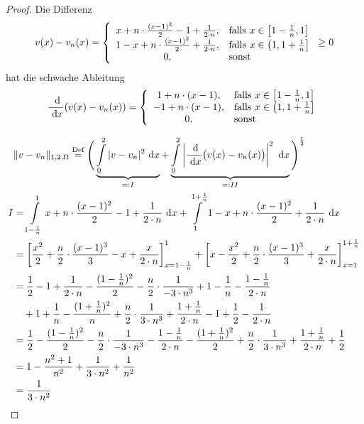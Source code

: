 \begin{proof}
	Die Differenz
	\begin{align*}
		v(x)-v_n(x)=\left\lbrace\begin{array}{cl}
			x+n\cdot\frac{(x-1)^2}{2}-1+\frac{1}{2\cdot n}, & \text{falls } x\in\left[1-\frac{1}{n},1\right]\\
			1-x+n\cdot\frac{(x-1)^2}{2}+\frac{1}{2\cdot n}, & \text{falls } x\in\left(1,1+\frac{1}{n}\right]\\
			0,&\text{sonst }
		\end{array}\right.\stackrel{\text{}}{\geq}0\\
	\end{align*}
	hat die schwache Ableitung
	\begin{align*}
		\frac{\text{ d}}{\text{ d} x}(v(x)-v_n(x))=\left\lbrace\begin{array}{cl}
			1+n\cdot(x-1), & \text{falls } x\in\left[1-\frac{1}{n},1\right]\\
			-1+n\cdot(x-1), & \text{falls } x\in\left(1,1+\frac{1}{n}\right]\\
			0,&\text{sonst }
		\end{array}\right.
	\end{align*}

	\begin{align*}
		&\Vert v-v_n\Vert_{1,2,\Omega}
		\overset{\text{Def}}=
		\Bigg(\underbrace{\int\limits_0^2|v -v_n|^2\text{ d} x}_{=:I}+\underbrace{\int\limits_0^2\left|\frac{\text{ d}}{\text{ d} x} \big(v(x)-v_n(x)\big)\right|^2\text{ d} x}_{=:II}\Bigg)^{\frac{1}{2}}\\
		I&=\int\limits_{1-\frac{1}{n}}^1 x+n\cdot\frac{(x-1)^2}{2}-1+\frac{1}{2\cdot n}\text{ d} x+
		\int\limits_1^{1+\frac{1}{n}}1-x+n\cdot\frac{(x-1)^2}{2}+\frac{1}{2\cdot n}\text{ d} x\\
		&=\left[\frac{x^2}{2}+\frac{n}{2}\cdot\frac{(x-1)^3}{3}-x+\frac{x}{2\cdot n}\right]_{x=1-\frac{1}{n}}^1
		+\left[x-\frac{x^2}{2}+\frac{n}{2}\cdot\frac{(x-1)^3}{3}+\frac{x}{2\cdot n}\right]_{x=1}^{1+\frac{1}{n}}\\
		&=\frac{1}{2}-1+\frac{1}{2\cdot n}-\frac{(1-\frac{1}{n})^2}{2}-\frac{n}{2}\cdot\frac{1}{-3\cdot n^3}+1-\frac{1}{n}-\frac{1-\frac{1}{n}}{2\cdot n}\\
		&~~~+1+\frac{1}{n}-\frac{(1+\frac{1}{n})^2}{n}+\frac{n}{2}\cdot\frac{1}{3\cdot n^3}+\frac{1+\frac{1}{n}}{2\cdot n}-1+\frac{1}{2}-\frac{1}{2\cdot n}\\
		&=\frac{1}{2}-\frac{(1-\frac{1}{n})^2}{2}-\frac{n}{2}\cdot\frac{1}{-3\cdot n^3}-\frac{1-\frac{1}{n}}{2\cdot n}
		-\frac{(1+\frac{1}{n})^2}{2}+\frac{n}{2}\cdot\frac{1}{3\cdot n^3}+\frac{1+\frac{1}{n}}{2\cdot n}+\frac{1}{2}\\
		&=1-\frac{n^2+1}{n^2}+\frac{1}{3\cdot n^2}+\frac{1}{n^2}\\
		&=\frac{1}{3\cdot n^2}
	\end{align*}
	

\end{proof}
